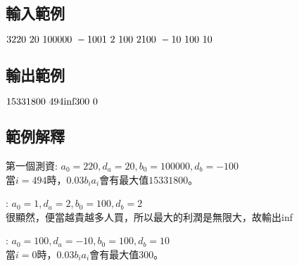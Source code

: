 \documentclass{article}
\begin{document}
\begin{CJK*}{UTF8}{bsmi}
\subsection*{輸入範例}
$3\\220\ 20\ 100000\ -100\\1\ 2\ 100\ 2\\100\ -10\ 100\ 10$

\subsection*{輸出範例}
$15331800\ 494\\\text{inf}\\300\ 0$

\subsection*{範例解釋}
第一個測資: $a_0=220,d_a=20,b_0=100000,d_b=-100$\\
當$i=494$時，$0.03b_ia_i$會有最大值$15331800$。

: $a_0=1,d_a=2,b_0=100,d_b=2$\\
很顯然，便當越貴越多人買，所以最大的利潤是無限大，故輸出inf

: $a_0=100,d_a=-10,b_0=100,d_b=10$\\
當$i=0$時，$0.03b_ia_i$會有最大值$300$。

\end{CJK*}
\end{document}
